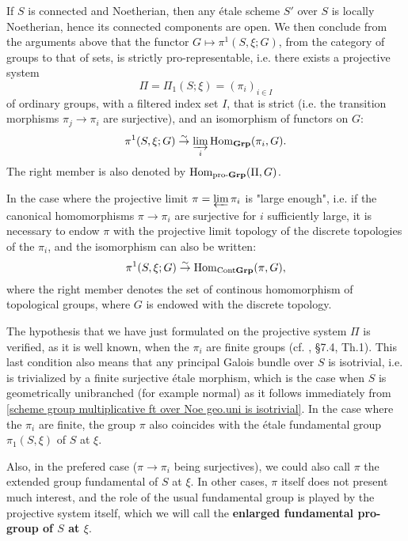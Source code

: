 If $S$ is connected and Noetherian, then any \'etale scheme $S'$ over $S$ is locally Noetherian, hence its connected components are open. We then conclude from the arguments above that the functor $G\mapsto\pi^1(S,\xi;G)$, from the category of groups to that of sets, is strictly pro-representable, i.e. there exists a projective system 
\[\Pi=\Pi_1(S;\xi)=(\pi_i)_{i\in I}\]
of ordinary groups, with a filtered index set $I$, that is strict (i.e. the transition morphisms $\pi_j\to\pi_i$ are surjective), and an isomorphism of functors on $G$:
\[\pi^1(S,\xi;G)\stackrel{\sim}{\to}\varinjlim_i\mathrm{Hom}_{\mathbf{Grp}}(\pi_i,G).\]
The right member is also denoted by $\mathrm{Hom}_{\mathrm{pro}\textup{-}\mathbf{Grp}}(\Pi,G)$.\par
In the case where the projective limit $\pi=\varprojlim\pi_i$ is "large enough", i.e. if the canonical homomorphisms $\pi\to\pi_i$ are surjective for $i$ sufficiently large, it is necessary to endow $\pi$ with the projective limit topology of the discrete topologies of the $\pi_i$, and the isomorphism can also be written:
\[\pi^1(S,\xi;G)\stackrel{\sim}{\to} \mathrm{Hom}_{\mathrm{Cont}\mathbf{Grp}}(\pi,G),\]
where the right member denotes the set of continous homomorphism of topological groups, where $G$ is endowed with the discrete topology.\par
The hypothesis that we have just formulated on the projective system $\Pi$ is verified, as it is well known, when the $\pi_i$ are finite groups (cf. \cite{BEns},  \S 7.4, Th.1). This last condition also means that any principal Galois bundle over $S$ is isotrivial, i.e. is trivialized by a finite surjective \'etale morphism, which is the case when $S$ is geometrically unibranched (for example normal) as it follows immediately from \cref{scheme group multiplicative ft over Noe geo.uni is isotrivial}. In the case where the $\pi_i$ are finite, the group $\pi$ also coincides with the \'etale fundamental group $\pi_1(S,\xi)$ of $S$ at $\xi$.\par
Also, in the prefered case ($\pi\to\pi_i$ being surjectives), we could also call $\pi$ the extended group fundamental of $S$ at $\xi$. In other cases, $\pi$ itself does not present much interest, and the role of the usual fundamental group is played by the projective system itself, which we will call the \textbf{enlarged fundamental pro-group of $S$ at $\xi$}.\par


